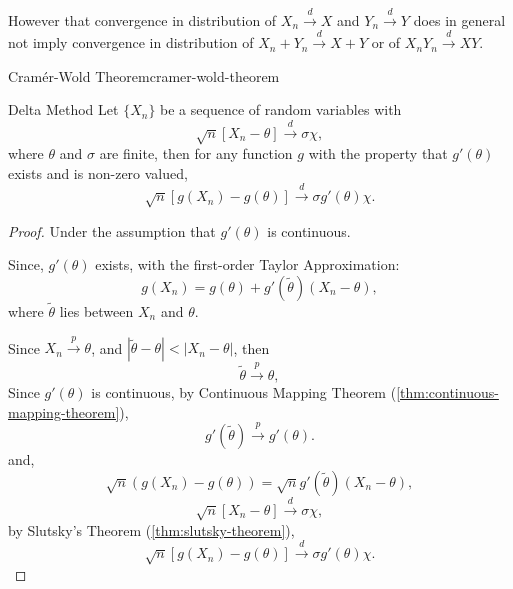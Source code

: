 \begin{note}
    However that convergence in distribution of $X_{n}\stackrel{d}{\rightarrow}X$ and $Y_{n}\stackrel{d}{\rightarrow}Y$ does in general not imply convergence in distribution of $X_n+Y_n\stackrel{d}{\rightarrow}X+Y$ or of $X_nY_n\stackrel{d}{\rightarrow}XY$.
\end{note}

\begin{theorem}{Cram\'er-Wold Theorem}{cramer-wold-theorem}
    
\end{theorem}

\begin{theorem}{Delta Method}{}
    Let $\{X_{n}\}$ be a sequence of random variables with
    \begin{equation*}
        \sqrt{n}\left[X_{n}-\theta\right] \stackrel{d}{\rightarrow}\sigma\chi,
    \end{equation*}
    where $\theta$ and $\sigma$ are finite, then for any function $g$ with the property that $g'(\theta)$ exists and is non-zero valued,
    \begin{equation*}
        \sqrt{n}\left[g\left(X_{n}\right)-g(\theta)\right] \stackrel{d}{\rightarrow} \sigma g'(\theta)\chi.
    \end{equation*}
\end{theorem}

\begin{proof}
    Under the assumption that $g'(\theta)$ is continuous.

    Since, $g'(\theta)$ exists, with the first-order Taylor Approximation:
    \begin{equation*}
        g(X_n)=g(\theta)+g'(\tilde{\theta})(X_n-\theta),
    \end{equation*}
    where $\tilde{\theta}$ lies between $X_n$ and $\theta$.

    Since $X_n\stackrel{p}{\rightarrow}\theta$, and $|\tilde{\theta}-\theta|<|X_n-\theta|$, then
    \begin{equation*}
        \tilde{\theta}\stackrel{p}{\rightarrow}\theta,
    \end{equation*}
    Since $g'(\theta)$   is continuous, by Continuous Mapping Theorem (\ref{thm:continuous-mapping-theorem}),
    \begin{equation*}
        g'(\tilde{\theta})\stackrel{p}{\rightarrow}g'(\theta).
    \end{equation*}
    and,
    \begin{equation*}
        \sqrt{n}\left(g(X_n)-g(\theta)\right)=\sqrt{n}g'(\tilde{\theta})(X_n-\theta),
    \end{equation*}
    \begin{equation*}
        \sqrt{n}\left[X_{n}-\theta\right] \stackrel{d}{\rightarrow}\sigma\chi,
    \end{equation*}
    by Slutsky's Theorem (\ref{thm:slutsky-theorem}),
    \begin{equation*}
        \sqrt{n}\left[g\left(X_{n}\right)-g(\theta)\right] \stackrel{d}{\rightarrow} \sigma g'(\theta)\chi.
    \end{equation*}
\end{proof}

